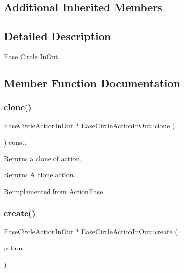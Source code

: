 \subsection*{Additional Inherited Members}


\subsection{Detailed Description}
Ease Circle In\+Out. 

\subsection{Member Function Documentation}
\mbox{\label{classEaseCircleActionInOut_a552bd0eca0772b24c6ff2624072f65c3}} 
\subsubsection{\texorpdfstring{clone()}{clone()}}
{\footnotesize\ttfamily \hyperlink{classEaseCircleActionInOut}{Ease\+Circle\+Action\+In\+Out} $\ast$ Ease\+Circle\+Action\+In\+Out\+::clone (\begin{DoxyParamCaption}\item[{void}]{ }\end{DoxyParamCaption}) const\hspace{0.3cm}{\ttfamily [override]}, {\ttfamily [virtual]}}

Returns a clone of action.

\begin{DoxyReturn}{Returns}
A clone action. 
\end{DoxyReturn}


Reimplemented from \hyperlink{classActionEase_a39bec93fe161fb732a74d8e51a2fe08b}{Action\+Ease}.

\mbox{\label{classEaseCircleActionInOut_a518d811f85a139e0ce8456d1af8ede44}} 
\subsubsection{\texorpdfstring{create()}{create()}}
{\footnotesize\ttfamily \hyperlink{classEaseCircleActionInOut}{Ease\+Circle\+Action\+In\+Out} $\ast$ Ease\+Circle\+Action\+In\+Out\+::create (\begin{DoxyParamCaption}\item[{\hyperlink{classActionInterval}{Action\+Interval} $\ast$}]{action }\end{DoxyParamCaption})\hspace{0.3cm}{\ttfamily [static]}}



